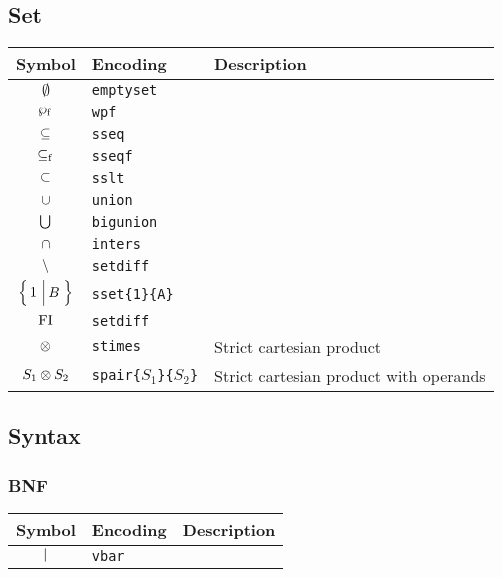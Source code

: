 \documentclass[11pt]{article}
\begin{document}
\subsection{Set}

\begin{table}[H]
	\def\arraystretch{1.5}
	\begin{tabular}{c l l}
		\textbf{Symbol} & \textbf{Encoding} & \textbf{Description} \\
		\hline 
		$\emptyset$ & \texttt{emptyset} &  \\ 
		$\mathop{\wp_\mathrm{f}}\nolimits$ & \texttt{wpf} &  \\
		$\subseteq$ & \texttt{sseq} &  \\
		$\mathrel{\subseteq_\mathrm{f}}$ & \texttt{sseqf} &  \\
		$\subset$ & \texttt{sslt} &  \\
		$\cup$ & \texttt{union} &  \\
		$\bigcup$ & \texttt{bigunion} &  \\
		$\cap$ & \texttt{inters} &  \\
		$\setminus$ & \texttt{setdiff} &  \\
		$\sset{1}{B}$ & \texttt{sset\{1\}\{A\}} &  \\
		$\mathop{\mathrm{FI}}\nolimits$ & \texttt{setdiff} &  \\
		$\otimes$ & \texttt{stimes} & Strict cartesian product \\
		${S_1} \otimes {S_2}$ & \texttt{spair\{$S_1$\}\{$S_2$\}} & Strict cartesian product with operands \\
	\end{tabular} 
\end{table}

\subsection{Syntax}

\subsubsection{BNF}

\begin{table}[H]
	\def\arraystretch{1.5}
	\begin{tabular}{c l l}
		\textbf{Symbol} & \textbf{Encoding} & \textbf{Description} \\
		\hline 
		$\mathrel{\mid}$ & \texttt{vbar} & \\
	\end{tabular} 
\end{table} 
\end{document}
